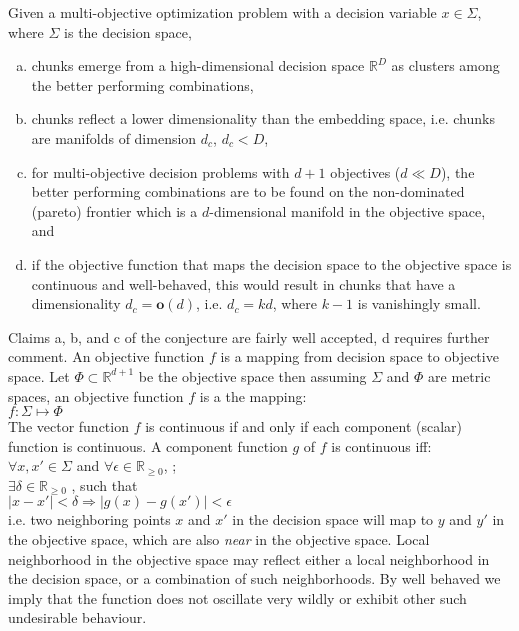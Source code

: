 \begin{conjecture}\label{cdconjecture}
  Given a multi-objective optimization problem with a decision variable $x
  \in \Sigma$, where $\Sigma$ is the decision space,


  \begin{enumerate}[(a)]
    \item chunks emerge from a high-dimensional decision space
      $\mathbb{R}^{D}$ as clusters among the better performing combinations,
    \item chunks reflect a lower dimensionality than the embedding space,
      i.e.  chunks are manifolds of dimension $d_{c}$, $d_{c} < D$,
    \item for multi-objective decision problems with $d+1$ objectives ($d
      \ll D$), the better performing combinations are to be found on the
      non-dominated (pareto) frontier which is a $d$-dimensional manifold
      in the objective space, and
    \item if the objective function that maps the decision space to the
      objective space is continuous and well-behaved, this would result in
      chunks that have a dimensionality $d_{c} = \textbf{o}(d)$,
      i.e. $d_{c} = kd$, where $k-1$ is vanishingly small.
  \end{enumerate}
\end{conjecture}

Claims a, b, and c of the conjecture are fairly well accepted, d requires
further comment. An objective function $f$ is a mapping from decision space
to objective space. Let $\Phi \subset \mathbb{R}^{d+1}$ be the objective
space then assuming $\Sigma$ and $\Phi$ are metric spaces, an objective function $f$ is a the mapping: \\
$f: \Sigma \mapsto \Phi$ \\
The vector function $f$ is continuous if and only if each component
(scalar) function is continuous. A component function $g$ of $f$ is
continuous iff:\\
$\forall x, x' \in \Sigma$ and $\forall \epsilon \in \mathbb{R}_{\geqslant 0}$, ;\\
$\exists \delta \in \mathbb{R}_{\geqslant 0}$ , such that \\
$|x - x'| < \delta \Rightarrow |g(x) - g(x')| < \epsilon$\\
i.e. two neighboring points $x$ and $x'$ in the decision space will map to
$y$ and $y'$ in the objective space, which are also {\em near} in the
objective space. Local neighborhood in the objective space may reflect
either a local neighborhood in the decision space, or a combination of such
neighborhoods. By well behaved we imply that the function does not
oscillate very wildly or exhibit other such undesirable behaviour.


